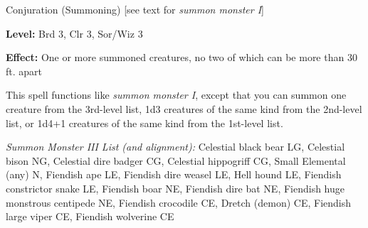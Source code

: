 
Conjuration (Summoning) [see text for \textit{summon monster I}]

\textbf{Level:} Brd 3, Clr 3, Sor/Wiz 3

\textbf{Effect:} One or more summoned creatures, no two of which can be more than 
30 ft. apart

This spell functions like \textit{summon monster I}, except that you can summon 
one creature from the 3rd-level list, 1d3 creatures of the same kind from the 2nd-level 
list, or 1d4+1 creatures of the same kind from the 1st-level list.

\textit{Summon Monster III List (and alignment):} Celestial black bear LG, Celestial bison NG, Celestial dire badger CG, Celestial hippogriff CG, Small Elemental (any) N, Fiendish ape LE, Fiendish dire weasel LE, Hell hound LE, Fiendish constrictor snake LE, Fiendish boar NE, Fiendish dire bat NE, Fiendish huge monstrous centipede NE, Fiendish crocodile CE, Dretch (demon) CE, Fiendish large viper CE, Fiendish wolverine CE
